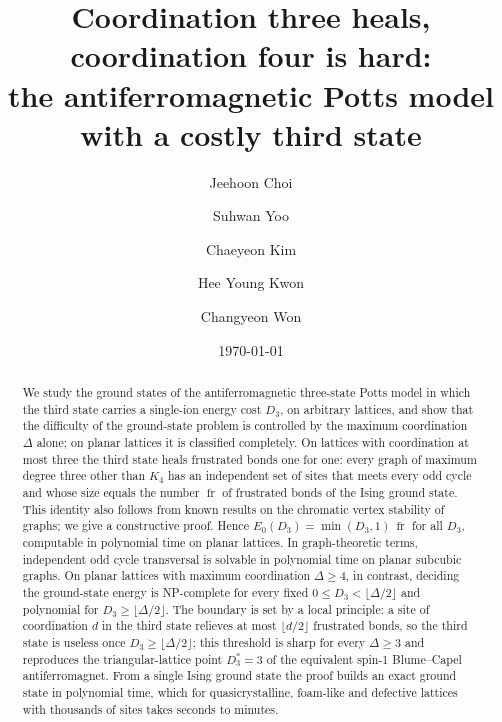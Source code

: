 \documentclass[aps,pre,twocolumn,floatfix,10pt]{revtex4-2}
\theoremstyle{definition}
\theoremstyle{remark}
\newcommand{\fr}{\operatorname{fr}}
\newcommand{\OPT}{E_0}
\begin{document}
\title{Coordination three heals, coordination four is hard:\texorpdfstring{\\}{ } the antiferromagnetic Potts model
with a costly third state}

\author{Jeehoon Choi}
\author{Suhwan Yoo}
\author{Chaeyeon Kim}
\author{Hee Young Kwon}
\author{Changyeon Won}
\date{\today}

\begin{abstract}
We study the ground states of the antiferromagnetic three-state Potts model in which the third
state carries a single-ion energy cost $D_3$, on arbitrary lattices, and show that the
difficulty of the ground-state problem is controlled by the maximum coordination $\Delta$ alone;
on planar lattices it is classified completely.
On lattices with coordination at most three the third state heals frustrated bonds one for one:
every graph of maximum degree three other than $K_4$ has an independent set of sites that meets
every odd cycle and whose size equals the number $\fr$ of frustrated bonds of the Ising ground
state. This identity also follows from known results on the chromatic vertex stability of graphs;
we give a constructive proof.
Hence $\OPT(D_3)=\min(D_3,1)\,\fr$ for all $D_3$, computable in polynomial time on planar
lattices. In graph-theoretic terms, independent odd cycle transversal is solvable in polynomial
time on planar subcubic graphs.
On planar lattices with maximum coordination $\Delta\ge4$, in contrast, deciding the ground-state
energy is NP-complete for every fixed $0\le D_3<\lfloor\Delta/2\rfloor$ and polynomial for
$D_3\ge\lfloor\Delta/2\rfloor$.
The boundary is set by a local principle: a site of coordination $d$ in the third state relieves
at most $\lfloor d/2\rfloor$ frustrated bonds, so the third state is useless once
$D_3\ge\lfloor\Delta/2\rfloor$; this threshold is sharp for every $\Delta\ge3$ and reproduces
the triangular-lattice point $D_3^*=3$ of the equivalent spin-1 Blume--Capel antiferromagnet.
From a single Ising ground state the proof builds an exact ground state in
polynomial time, which for quasicrystalline, foam-like and defective lattices with thousands of
sites takes seconds to minutes.
\end{abstract}

\maketitle
\end{document}
